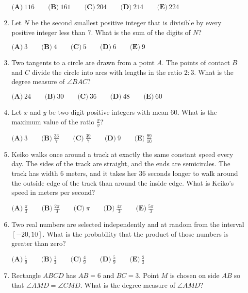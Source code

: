 \documentclass{article}
\begin{document}
\begin{enumerate}[label=\arabic*., itemsep=0.5em]
\(\textbf{(A)}\ 116 \qquad \textbf{(B)}\ 161 \qquad \textbf{(C)}\ 204 \qquad \textbf{(D)}\ 214 \qquad \textbf{(E)}\ 224\)\par \vspace{0.5em}\item Let \(N\) be the second smallest positive integer that is divisible by every positive integer less than \(7\).  What is the sum of the digits of \(N\)?

\(\textbf{(A)}\ 3 \qquad \textbf{(B)}\ 4 \qquad \textbf{(C)}\ 5 \qquad \textbf{(D)}\ 6 \qquad \textbf{(E)}\ 9\)\par \vspace{0.5em}\item Two tangents to a circle are drawn from a point \(A\).  The points of contact \(B\) and \(C\) divide the circle into arcs with lengths in the ratio \(2 : 3\).  What is the degree measure of \(\angle{BAC}\)?

\(\textbf{(A)}\ 24 \qquad \textbf{(B)}\ 30 \qquad \textbf{(C)}\ 36 \qquad \textbf{(D)}\ 48 \qquad \textbf{(E)}\ 60\)\par \vspace{0.5em}\item Let \(x\) and \(y\) be two-digit positive integers with mean \(60\).  What is the maximum value of the ratio \(\frac{x}{y}\)?

\(\textbf{(A)}\ 3 \qquad \textbf{(B)}\ \frac{33}{7} \qquad \textbf{(C)}\ \frac{39}{7} \qquad \textbf{(D)}\ 9 \qquad \textbf{(E)}\ \frac{99}{10}\)\par \vspace{0.5em}\item Keiko walks once around a track at exactly the same constant speed every day. The sides of the track are straight, and the ends are semicircles. The track has width \(6\) meters, and it takes her \(36\) seconds longer to walk around the outside edge of the track than around the inside edge. What is Keiko's speed in meters per second?

\(\textbf{(A)}\ \frac{\pi}{3} \qquad \textbf{(B)}\ \frac{2\pi}{3} \qquad \textbf{(C)}\ \pi \qquad \textbf{(D)}\ \frac{4\pi}{3} \qquad \textbf{(E)}\ \frac{5\pi}{3}\)\par \vspace{0.5em}\item Two real numbers are selected independently and at random from the interval \([-20,10]\).  What is the probability that the product of those numbers is greater than zero?

\(\textbf{(A)}\ \frac{1}{9} \qquad \textbf{(B)}\ \frac{1}{3} \qquad \textbf{(C)}\ \frac{4}{9} \qquad \textbf{(D)}\ \frac{5}{9} \qquad \textbf{(E)}\ \frac{2}{3}\)\par \vspace{0.5em}\item Rectangle \(ABCD\) has \(AB=6\) and \(BC=3\). Point \(M\) is chosen on side \(AB\) so that \(\angle AMD=\angle CMD\). What is the degree measure of \(\angle AMD\)?


\end{enumerate}
\end{document}

